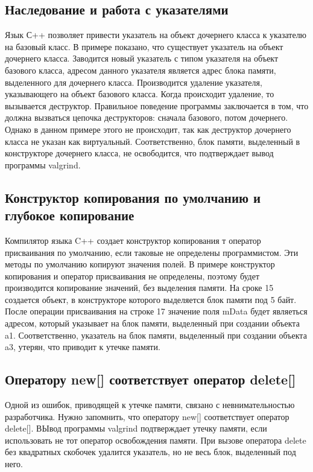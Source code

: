 \documentclass[10pt]{article}
\begin{document}
\subsection{Наследование и работа с указателями}
Язык С++ позволяет привести указатель на объект дочернего класса к указателю на
базовый класс. В примере показано, что существует указатель на объект дочернего класса.
Заводится новый указатель с типом указателя на объект базового класса, адресом данного
указателя является адрес блока памяти, выделенного для дочернего класса. Производится удаление
указателя, указывающего на объект базового класса. Когда происходит удаление, то вызывается деструктор.
Правильное поведение программы заключается в том, что должна вызваться цепочка деструкторов: сначала базового,
потом дочернего. Однако в данном примере этого не происходит, так как деструктор дочернего класса не указан
как виртуальный. Соответственно, блок памяти, выделенный в конструкторе дочернего класса, не освободится,
что подтверждает вывод программы valgrind.

\subsection{Конструктор копирования по умолчанию и глубокое копирование}
Компилятор языка C++ создает конструктор копирования т оператор присваивания по умолчанию, если
таковые не определены программистом. Эти методы по умолчанию копируют значения полей. В примере
конструктор копирования и оператор присваивания не определены, поэтому будет производится копирование
значений, без выделения памяти. На сроке 15 создается объект, в конструкторе которого выделяется
блок памяти под 5 байт. После операции присваивания на строке 17 значение поля mData будет являеться
адресом, который указывает на блок памяти, выделенный при создании объекта a1. Соответственно, указатель
на блок памяти, выделенный при создании объекта a3, утерян, что приводит к утечке памяти.

\subsection{Оператору new[] соответствует оператор delete[]}
Одной из ошибок, приводящей к утечке памяти, связано с невнимательностью разработчика.
Нужно запомнить, что оператору new[] соответствует оператор delete[]. ВЫвод программы valgrind подтверждает утечку памяти,
если использовать не тот оператор освобождения памяти. При вызове оператора delete без квадратных скобочек
удалится указатель, но не весь блок, выделенный под него.
\end{document}
